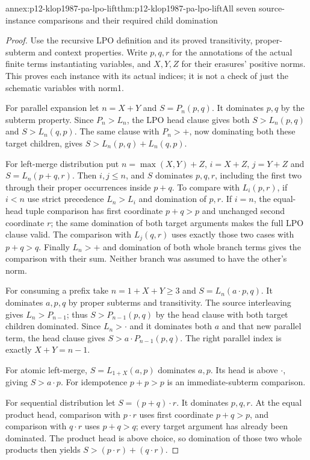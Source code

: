 \begin{annexitem}{annex:p12-klop1987-pa-lpo-lift}{thm:p12-klop1987-pa-lpo-lift}{All seven source-instance comparisons and their required child domination}
\begin{proof}
Use the recursive LPO definition and its proved transitivity,
proper-subterm and context properties. Write \(p,q,r\) for
the annotations of the actual finite terms instantiating variables,
and \(X,Y,Z\) for their erasures' positive norms. This proves
each instance with its actual indices; it is not a check of just
the schematic variables with norm1.

For parallel expansion let \(n=X+Y\) and
\(S=P_n(p,q)\). It dominates \(p,q\) by the subterm property.
Since \(P_n>L_n\), the LPO head clause gives both
\(S>L_n(p,q)\) and \(S>L_n(q,p)\). The same clause with
\(P_n>+\), now dominating both these target children, gives
\(S>L_n(p,q)+L_n(q,p)\).

For left-merge distribution put
\(n=\max(X,Y)+Z\), \(i=X+Z\), \(j=Y+Z\) and
\(S=L_n(p+q,r)\). Then \(i,j\leq n\), and \(S\)
dominates \(p,q,r\), including the first two through their
proper occurrences inside \(p+q\). To compare with \(L_i(p,r)\),
if \(i<n\) use strict precedence \(L_n>L_i\) and domination
of \(p,r\). If \(i=n\), the equal-head tuple comparison
has first coordinate \(p+q>p\) and unchanged second coordinate
\(r\); the same domination of both target arguments makes
the full LPO clause valid. The comparison with \(L_j(q,r)\)
uses exactly those two cases with \(p+q>q\). Finally
\(L_n>+\) and domination of both whole branch terms gives
the comparison with their sum. Neither branch was assumed to
have the other's norm.

For consuming a prefix take \(n=1+X+Y\geq3\) and
\(S=L_n(a\cdot p,q)\). It dominates \(a,p,q\) by proper
subterms and transitivity. The source interleaving gives
\(L_n>P_{n-1}\); thus \(S>P_{n-1}(p,q)\) by the head
clause with both target children dominated. Since \(L_n>\cdot\)
and it dominates both \(a\) and that new parallel term, the
head clause gives \(S>a\cdot P_{n-1}(p,q)\).
The right parallel index is exactly \(X+Y=n-1\).

For atomic left-merge, \(S=L_{1+X}(a,p)\) dominates \(a,p\).
Its head is above \(\cdot\), giving \(S>a\cdot p\).
For idempotence \(p+p>p\) is an immediate-subterm comparison.

For sequential distribution let \(S=(p+q)\cdot r\).
It dominates \(p,q,r\). At the equal product head, comparison
with \(p\cdot r\) uses first coordinate \(p+q>p\), and
comparison with \(q\cdot r\) uses \(p+q>q\); every target
argument has already been dominated. The product head is above
choice, so domination of those two whole products then yields
\(S>(p\cdot r)+(q\cdot r)\).


\end{proof}
\end{annexitem}
